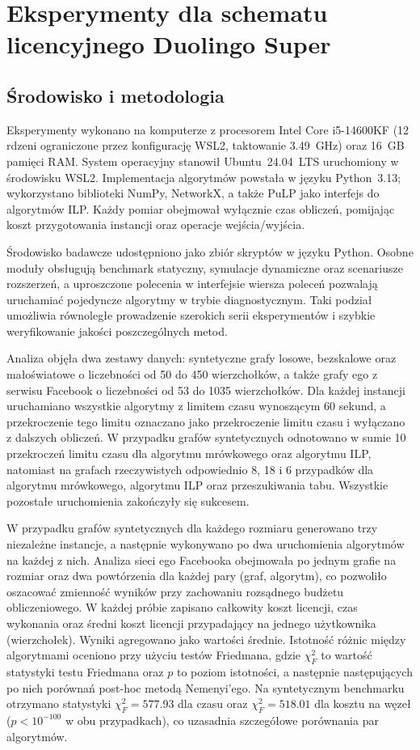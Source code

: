 \chapter{Eksperymenty dla schematu licencyjnego Duolingo Super}
\label{chap:experiments}
\section{Środowisko i metodologia}

Eksperymenty wykonano na komputerze z procesorem Intel Core i5-14600KF (12 rdzeni ograniczone przez konfigurację WSL2, taktowanie 3.49~GHz) oraz 16~GB pamięci RAM. System operacyjny stanowił Ubuntu~24.04~LTS uruchomiony w środowisku WSL2. Implementacja algorytmów powstała w języku Python~3.13; wykorzystano biblioteki NumPy, NetworkX, a także PuLP jako interfejs do algorytmów ILP. Każdy pomiar obejmował wyłącznie czas obliczeń, pomijając koszt przygotowania instancji oraz operacje wejścia/wyjścia.

Środowisko badawcze udostępniono jako zbiór skryptów w języku Python. Osobne moduły obsługują benchmark statyczny, symulacje dynamiczne oraz scenariusze rozszerzeń, a uproszczone polecenia w interfejsie wiersza poleceń pozwalają uruchamiać pojedyncze algorytmy w trybie diagnostycznym. Taki podział umożliwia równoległe prowadzenie szerokich serii eksperymentów i szybkie weryfikowanie jakości poszczególnych metod.

Analiza objęła dwa zestawy danych: syntetyczne grafy losowe, bezskalowe oraz małoświatowe o liczebności od 50 do 450 wierzchołków, a także grafy ego z serwisu Facebook o liczebności od 53 do 1035 wierzchołków. Dla każdej instancji uruchamiano wszystkie algorytmy z limitem czasu wynoszącym 60 sekund, a przekroczenie tego limitu oznaczano jako przekroczenie limitu czasu i wyłączano z dalszych obliczeń. W przypadku grafów syntetycznych odnotowano w sumie 10 przekroczeń limitu czasu dla algorytmu mrówkowego oraz algorytmu ILP, natomiast na grafach rzeczywistych odpowiednio 8, 18 i 6 przypadków dla algorytmu mrówkowego, algorytmu ILP oraz przeszukiwania tabu. Wszystkie pozostałe uruchomienia zakończyły się sukcesem.

W przypadku grafów syntetycznych dla każdego rozmiaru generowano trzy niezależne instancje, a następnie wykonywano po dwa uruchomienia algorytmów na każdej z nich. Analiza sieci ego Facebooka obejmowała po jednym grafie na rozmiar oraz dwa powtórzenia dla każdej pary (graf, algorytm), co pozwoliło oszacować zmienność wyników przy zachowaniu rozsądnego budżetu obliczeniowego. W każdej próbie zapisano całkowity koszt licencji, czas wykonania oraz średni koszt licencji przypadający na jednego użytkownika (wierzchołek). Wyniki agregowano jako wartości średnie. Istotność różnic między algorytmami oceniono przy użyciu testów Friedmana, gdzie $\chi^2_F$ to wartość statystyki testu Friedmana oraz $p$ to poziom istotności, a następnie następujących po nich porównań post-hoc metodą Nemenyi'ego. Na syntetycznym benchmarku otrzymano statystyki $\chi^2_F = 577.93$ dla czasu oraz $\chi^2_F = 518.01$ dla kosztu na węzeł ($p < 10^{-100}$ w obu przypadkach), co uzasadnia szczegółowe porównania par algorytmów.

